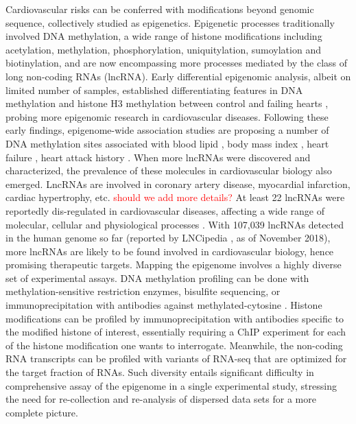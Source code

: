 \documentclass[letter]{bioinfo}
\newcommand{\comment}[1]{\textcolor{red}{#1}}
\begin{document}
Cardiovascular risks can be conferred with modifications beyond genomic sequence, collectively studied as epigenetics. Epigenetic processes traditionally involved DNA methylation, a wide range of histone modifications including acetylation, methylation, phosphorylation, uniquitylation, sumoylation and biotinylation, and are now encompassing more processes mediated by the class of long non-coding RNAs (lncRNA). Early differential epigenomic analysis, albeit on limited number of samples, established differentiating features in DNA methylation and histone H3 methylation between control and failing hearts \citep{Movassagh:2011:Distinct}, probing more epigenomic research in cardiovascular diseases. Following these early findings, epigenome-wide association studies are proposing a number of DNA methylation sites associated with blood lipid \citep{Irvin:2014:Epigenomewide}, body mass index \citep{Dick:2014:DNA, Wahl:2017:Epigenomewide}, heart failure \citep{Meder:2017:EpigenomeWide}, heart attack history \citep{Rask-Andersen:2016:Epigenomewide}.
When more lncRNAs were discovered and characterized, the prevalence of these molecules in cardiovascular biology also emerged. LncRNAs are involved in coronary artery disease, myocardial infarction, cardiac hypertrophy, etc. \comment{should we add more details?}  At least 22 lncRNAs were reportedly dis-regulated in cardiovascular diseases, affecting a wide range of molecular, cellular and physiological processes \citep{Das:2018:Deciphering}. With 107,039 lncRNAs detected in the human genome so far (reported by LNCipedia \citep{Volders:2018:LNCipedia}, as of November 2018), more lncRNAs are likely to be found involved in cardiovascular biology, hence promising therapeutic targets.
Mapping the epigenome involves a highly diverse set of experimental assays. DNA methylation profiling can be done with methylation-sensitive restriction enzymes, bisulfite sequencing, or immunoprecipitation with antibodies against  methylated-cytosine \citep{Bibikova:2010:Genomewide}. Histone modifications can be profiled by immunoprecipitation with antibodies specific to the modified histone of interest, essentially requiring a ChIP experiment for each of the histone modification one wants to interrogate. Meanwhile, the non-coding RNA transcripts can be profiled with variants of RNA-seq that are optimized for the target fraction of RNAs. Such diversity entails significant difficulty in comprehensive assay of the epigenome in a single experimental study, stressing the need for re-collection and re-analysis of dispersed data sets for a more complete picture.
\end{document}
